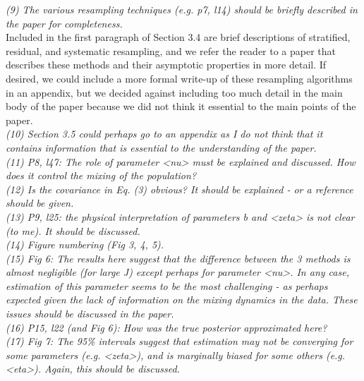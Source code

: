 \documentclass{article}
\begin{document}
\noindent \emph{(9) The various resampling techniques (e.g. p7, l14) should be briefly described in the paper for completeness.} \\

Included in the first paragraph of Section 3.4 are brief descriptions of stratified, residual, and systematic resampling, and we refer the reader to a paper that describes these methods and their asymptotic properties in more detail. If desired, we could include a more formal write-up of these resampling algorithms in an appendix, but we decided against including too much detail in the main body of the paper because we did not think it essential to the main points of the paper. \\

\noindent \emph{(10) Section 3.5 could perhaps go to an appendix as I do not think that it contains information that is essential to the understanding of the paper.} \\

\noindent \emph{(11) P8, l47: The role of parameter <nu> must be explained and discussed. How does it control the mixing of the population?} \\

\noindent \emph{(12) Is the covariance in Eq. (3) obvious? It should be explained - or a reference should be given.} \\

\noindent \emph{(13) P9, l25: the physical interpretation of parameters b and <zeta> is not clear (to me). It should be discussed.} \\

\noindent \emph{(14) Figure numbering (Fig 3, 4, 5).} \\

\noindent \emph{(15) Fig 6: The results here suggest that the difference between the 3 methods is almost negligible (for large J) except perhaps for parameter <nu>. In any case, estimation of this parameter seems to be the most challenging - as perhaps expected given the lack of information on the mixing dynamics in the data. These issues should be discussed in the paper.} \\

\noindent \emph{(16) P15, l22 (and Fig 6): How was the true posterior approximated here?} \\

\noindent \emph{(17) Fig 7: The 95\% intervals suggest that estimation may not be converging for some parameters (e.g. <zeta>), and is marginally biased for some others (e.g. <eta>). Again, this should be discussed.} \\
\end{document}
